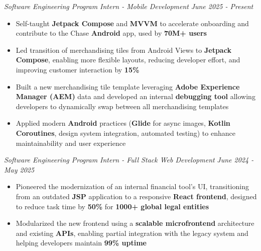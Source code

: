 \documentclass[letterpaper]{article}
\newenvironment{tightitemize}{%
  \begin{itemize}\small\setlength{\baselineskip}{0.95\baselineskip}\itemsep -1mm%
}{\end{itemize}}
\begin{document}
    \textit{Software Engineering Program Intern - Mobile Development} \hfill \textsl{June 2025 - Present}\\
    \vspace{-7pt}
    \begin{tightitemize} \itemsep -1mm

            \item Self-taught \textbf{Jetpack Compose} and \textbf{MVVM} to accelerate onboarding and contribute to the Chase \textbf{Android} app, used by \textbf{70M+ users}
            
            \item Led transition of merchandising tiles from Android Views to \textbf{Jetpack Compose}, enabling more flexible layouts, reducing developer effort, and improving customer interaction by \textbf{15\%}
            
            \item Built a new merchandising tile template leveraging \textbf{Adobe Experience Manager (AEM)} data and developed an internal \textbf{debugging tool} allowing developers to dynamically swap between all merchandising templates
            
            \item Applied modern \textbf{Android} practices (\textbf{Glide} for async images, \textbf{Kotlin Coroutines}, design system integration, automated testing) to enhance maintainability and user experience
                    
    \end{tightitemize}
    \textit{Software Engineering Program Intern - Full Stack Web Development} \hfill \textsl{June 2024 - May 2025}\\
    \vspace{-7pt}
    \begin{tightitemize} \itemsep -1mm

            \item Pioneered the modernization of an internal financial tool's UI, transitioning from an outdated \textbf{JSP} application to a responsive \textbf{React frontend}, designed to reduce task time by \textbf{50\%} for \textbf{1000+ global legal entities}

            \item Modularized the new frontend using a \textbf{scalable microfrontend} architecture and existing \textbf{APIs}, enabling partial integration with the legacy system and helping developers maintain \textbf{99\% uptime}
                    
    \end{tightitemize}
    \vspace{-2mm}
\end{document}
